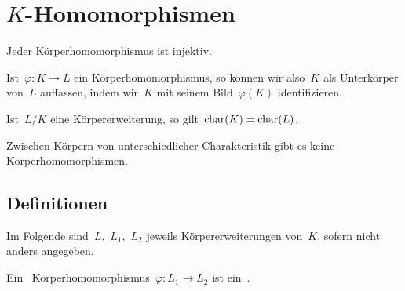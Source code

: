 \clearpage





\section{\texorpdfstring{$K$}{K}-Homomorphismen}

\begin{proposition}
  Jeder Körperhomomorphismus ist injektiv.
\end{proposition}

\begin{remark}
  Ist~$\varphi \colon K \to L$ ein Körperhomomorphismus, so können wir also~$K$ als Unterkörper von~$L$ auffassen, indem wir~$K$ mit seinem Bild~$\varphi(K)$ identifizieren.
\end{remark}

\begin{lemma}
  Ist~$L/K$ eine Körpererweiterung, so gilt~$\operatorname{char}(K) = \operatorname{char}(L)$.
\end{lemma}

\begin{proposition}
  Zwischen Körpern von unterschiedlicher Charakteristik gibt es keine Körperhomomorphismen.
\end{proposition}



\subsection{Definitionen}

\begin{convention}
  Im Folgende sind~$L$,~$L_1$,~$L_2$ jeweils Körpererweiterungen von~$K$, sofern nicht anders angegeben.
\end{convention}

\begin{definition}
  Ein~ Körperhomomorphismus~$\varphi \colon L_1 \to L_2$ ist ein~.
\end{definition}

